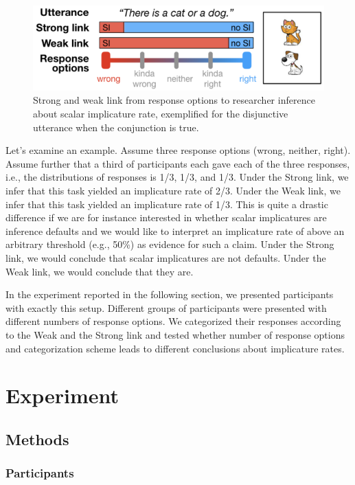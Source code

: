 \documentclass[floatsintext,man]{apa6}
\theoremstyle{definition}
\theoremstyle{definition}
\theoremstyle{definition}
\theoremstyle{remark}
\begin{document}
\begin{figure}
\centering
\includegraphics{writeup_files/figure-latex/linkvisualization-1.pdf}
\caption{\label{fig:linkvisualization}Strong and weak link from response
options to researcher inference about scalar implicature rate,
exemplified for the disjunctive utterance when the conjunction is true.}
\end{figure}

Let's examine an example. Assume three response options (wrong, neither,
right). Assume further that a third of participants each gave each of
the three responses, i.e., the distributions of responses is 1/3, 1/3,
and 1/3. Under the Strong link, we infer that this task yielded an
implicature rate of 2/3. Under the Weak link, we infer that this task
yielded an implicature rate of 1/3. This is quite a drastic difference
if we are for instance interested in whether scalar implicatures are
inference defaults and we would like to interpret an implicature rate of
above an arbitrary threshold (e.g., 50\%) as evidence for such a claim.
Under the Strong link, we would conclude that scalar implicatures are
not defaults. Under the Weak link, we would conclude that they are.

In the experiment reported in the following section, we presented
participants with exactly this setup. Different groups of participants
were presented with different numbers of response options. We
categorized their responses according to the Weak and the Strong link
and tested whether number of response options and categorization scheme
leads to different conclusions about implicature rates.

\section{Experiment}\label{experiment}

\subsection{Methods}\label{methods}

\subsubsection{Participants}\label{participants}
\end{document}
